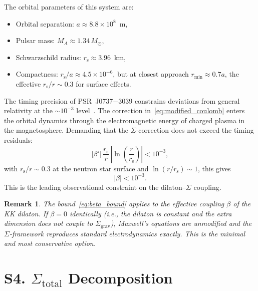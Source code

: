 \documentclass[letterpaper,twocolumn,superscriptaddress,longbibliography]{revtex4-2}
\newtheorem*{remark}{Remark}
\newcommand{\abs}[1]{\left|#1\right|}
\newcommand{\rs}{r_{\mathrm{s}}}
\newcommand{\Sgrav}{\Sigma_{\mathrm{grav}}}
\newcommand{\Stot}{\Sigma_{\mathrm{total}}}
\begin{document}
The orbital parameters of this system are:
\begin{itemize}
  \item Orbital separation: $a \approx 8.8 \times 10^8$~m,
  \item Pulsar mass: $M_A \approx 1.34\,M_\odot$,
  \item Schwarzschild radius: $\rs \approx 3.96$~km,
  \item Compactness: $\rs/a \approx 4.5 \times 10^{-6}$,
        but at closest approach $r_{\min} \approx 0.7a$,
        the effective $\rs/r \sim 0.3$ for surface effects.
\end{itemize}

The timing precision of PSR~J0737$-$3039 constrains
deviations from general relativity at the $\sim\!10^{-3}$
level~\cite{Kramer2006,Kramer2021}.  The correction
in~\eqref{eq:modified_coulomb} enters the orbital dynamics
through the electromagnetic energy of charged plasma in
the magnetosphere.  Demanding that the $\Sigma$-correction
does not exceed the timing residuals:
\begin{equation}
  \abs{\beta'}\,\frac{\rs}{r}\,
  \abs{\ln\!\left(\frac{r}{\rs}\right)}
  < 10^{-3},
  \label{eq:pulsar_bound}
\end{equation}
with $\rs/r \sim 0.3$ at the neutron star surface and
$\ln(r/\rs) \sim 1$, this gives
\begin{equation}
  \boxed{\;
  \abs{\beta} < 10^{-3}.
  \;}
  \label{eq:beta_bound}
\end{equation}
This is the leading observational constraint on the
dilaton--$\Sigma$ coupling.

\begin{remark}
The bound~\eqref{eq:beta_bound} applies to the
\emph{effective} coupling $\beta$ of the KK dilaton.
If $\beta = 0$ identically (i.e., the dilaton is constant
and the extra dimension does not couple to $\Sgrav$),
Maxwell's equations are unmodified and the $\Sigma$-framework
reproduces standard electrodynamics exactly.  This is the
minimal and most conservative option.
\end{remark}


\section{S4. $\Stot$ Decomposition}
\label{sec:decomposition}
\end{document}
